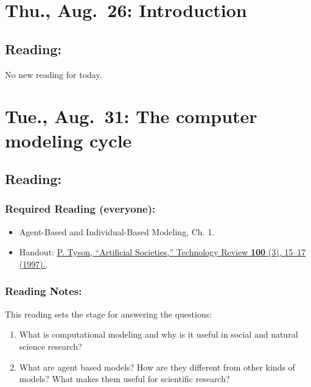 \documentclass[
]{article}
\providecommand{\tightlist}{%
  \setlength{\itemsep}{0pt}\setlength{\parskip}{0pt}}
\begin{document}
\hypertarget{thu.-aug.-26-introduction}{%
\section{Thu., Aug.~26: Introduction}\label{thu.-aug.-26-introduction}}

\hypertarget{reading}{%
\subsection{Reading:}\label{reading}}

No new reading for today.

\hypertarget{tue.-aug.-31-the-computer-modeling-cycle}{%
\section{Tue., Aug.~31: The computer modeling
cycle}\label{tue.-aug.-31-the-computer-modeling-cycle}}

\hypertarget{reading-1}{%
\subsection{Reading:}\label{reading-1}}

\hypertarget{required-reading-everyone}{%
\subsubsection{Required Reading
(everyone):}\label{required-reading-everyone}}

\begin{itemize}
\tightlist
\item
  Agent-Based and Individual-Based Modeling, Ch. 1.
\item
  Handout: \href{/files/reading/Tyson_Artificial_Societies_1997.pdf}{P.
  Tyson, ``Artificial Societies,'' Technology Review \textbf{100} (3),
  15--17 (1997).}.
\end{itemize}

\hypertarget{reading-notes}{%
\subsubsection{Reading Notes:}\label{reading-notes}}

This reading sets the stage for answering the questions:

\begin{enumerate}
\def\labelenumi{\arabic{enumi}.}
\tightlist
\item
  What is computational modeling and why is it useful in social and
  natural science research?
\item
  What are agent based models? How are they different from other kinds
  of models? What makes them useful for scientific research?
\end{enumerate}
\end{document}
